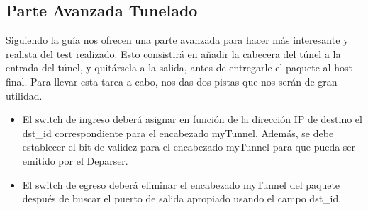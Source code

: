 \subsection{Parte Avanzada Tunelado}
Siguiendo la guía nos ofrecen una parte avanzada para hacer más interesante y realista del test realizado. Esto consistirá en añadir la cabecera del túnel a la entrada del túnel, y quitársela a la salida, antes de entregarle el paquete al host final. \newline
\newline
Para llevar esta tarea a cabo, nos das dos pistas que nos serán de gran utilidad.
\begin{itemize}
    \item El switch de ingreso deberá asignar en función de la dirección IP de destino el dst\_id correspondiente para el encabezado myTunnel. Además, se debe establecer el bit de validez para el encabezado myTunnel para que pueda ser emitido por el Deparser.
    \item El switch de egreso deberá eliminar el encabezado myTunnel del paquete después de buscar el puerto de salida apropiado usando el campo dst\_id.
\end{itemize}


